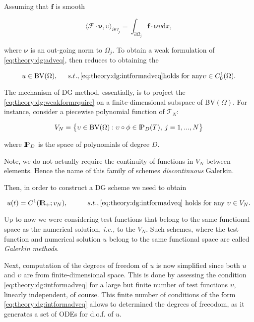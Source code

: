 Assuming that $\boldsymbol{f}$ is smooth 

\begin{equation}
\langle\boldsymbol{\mathcal{F}}\cdot\boldsymbol{\nu},\upsilon\rangle_{\partial\Omega_j} = \int_{\partial\Omega_j}\boldsymbol{f}\cdot\boldsymbol{\nu}\upsilon\text{d}x,
\end{equation}

where $\boldsymbol{\nu}$ is an out-going norm to $\Omega_j$. 
To obtain a weak formulation of \ref{eq:theory:dg:adveq}, then reduces to obtaining the 

\begin{equation}
u\in\text{BV}(\Omega), \hspace{5mm} s.t., \ref{eq:theory:dg:intformadveq} \text{holds for any} \upsilon \in C_0 ^1(\Omega).
\label{eq:theory:dg:weakformrquire}
\end{equation}

The mechanism of DG method, essentially, is to project the \ref{eq:theory:dg:weakformrquire} on a finite-dimensional subspace of BV$(\Omega)$. 
For instance, consider a piecewise polynomial function of $\mathcal{T}_{N}$:

\begin{equation}
V_N = \big\{ \upsilon\in\text{BV}(\Omega):\upsilon\circ\phi\in\text{I\!P}_{D}(T), \: j=1,...,N \big\}
\end{equation}

where $\text{I\!P}_{D}$ is the space of polynomials of degree $D$. 

Note, we do not actually require the continuity of functions in $V_N$ between elements. Hence the name of this family of schemes \textit{discontinuous} Galerkin. 

Then, in order to construct a DG scheme we need to obtain

\begin{equation}
u(t) = C^1(\text{I\!R}_{+};v_N), \hspace{10mm} s.t., \ref{eq:theory:dg:intformadveq} \text{ holds for any } \upsilon\in V_N.
\label{eq:theory:dg:weakform}
\end{equation}

Up to now we were considering test functions that belong to the same functional space as the numerical solution, \textit{i.e.,} to the $V_N$. 
Such schemes, where the test function and numerical solution $u$ belong to the same functional space are called \textit{Galerkin methods}. 

Next, computation of the degrees of freedom of $u$ is now simplified since both $u$ and $\upsilon$ are from finite-dimensional space. 
This is done by assessing the condition \ref{eq:theory:dg:intformadveq} for a large but finite number of test functions $\upsilon$, linearly independent, of course. This finite number of conditions of the form \ref{eq:theory:dg:intformadveq} allows to determined the degrees of freeodom, as it generates a set of ODEs for d.o.f. of $u$. 

